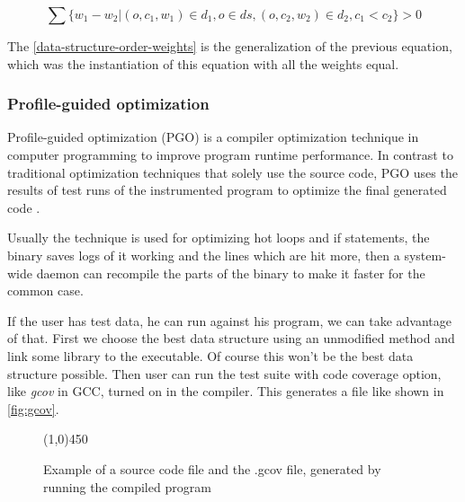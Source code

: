 \documentclass[a4paper,11pt]{article}
\begin{document}
            \begin{equation} \label{data-structure-order-weights}
                \displaystyle \sum \{w_1 - w_2| (o, c_1, w_1) \in d_1, o \in ds, (o,c_2, w_2) \in d_2, c_1 < c_2 \} > 0
            \end{equation}

            The \autoref{data-structure-order-weights} is the generalization of the previous equation, which was the
            instantiation of this equation with all the weights equal.


		\subsubsection{Profile-guided optimization} \label{sec:pgo}

			Profile-guided optimization (PGO) is a compiler optimization technique in computer programming
			to improve program runtime performance.  In contrast to traditional optimization techniques that
			solely use the source code, PGO uses the results of test runs of the instrumented program to
            optimize the final generated code \cite{Wipgo}.

            Usually the technique is used for optimizing hot loops and if statements, the binary saves logs of it
            working and the lines which are hit more, then a system-wide daemon can recompile the parts of the binary to
            make it faster for the common case.

			If the user has test data, he can run against his program, we can take advantage of that.  First
			we choose the best data structure using an unmodified method and link some library to the
			executable. Of course this won't be the best data structure possible. Then user can run the test
			suite with code coverage option, like \emph{gcov} in GCC, turned on in the compiler. This
			generates a file like shown in \autoref{fig:gcov}.

			\begin{figure} \label{fig:gcov}
				

				\centering \line(1,0){450}

				

				\caption{Example of a source code file and the .gcov file, generated by running the
				compiled program}

				\label{fig:gcov}
			\end{figure}
\end{document}

